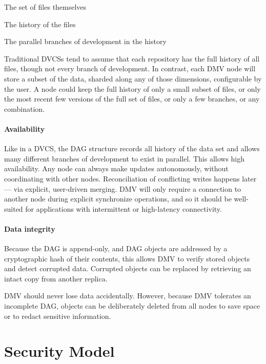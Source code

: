 \begin{tight_enumerate}
    \item The set of files themselves
    \item The history of the files
    \item The parallel branches of development in the history
\end{tight_enumerate}

Traditional \glspl{DVCS} tend to assume that each repository has the full
history of all files, though not every branch of development. In contrast, each
\gls{DMV} node will store a subset of the data, sharded along any of those
dimensions, configurable by the user. A node could keep the full history of only
a small subset of files, or only the most recent few versions of the full set of
files, or only a few branches, or any combination.


\paragraph{Availability}

Like in a \gls{DVCS}, the \gls{DAG} structure records all history of the data
set and allows many different branches of development to exist in parallel. This
allows high availability. Any node can always make updates autonomously, without
coordinating with other nodes. Reconciliation of conflicting writes happens
later --- via explicit, user-driven merging. \gls{DMV} will only require a
connection to another node during explicit synchronize operations, and so it
should be well-suited for applications with intermittent or high-latency
connectivity.


\paragraph{Data integrity}

Because the \gls{DAG} is append-only, and \gls{DAG} objects are addressed by a
cryptographic hash of their contents, this allows \gls{DMV} to verify stored
objects and detect corrupted data. Corrupted objects can be replaced by
retrieving an intact copy from another replica.

\gls{DMV} should never lose data accidentally. However, because \gls{DMV}
tolerates an incomplete \gls{DAG}, objects can be deliberately deleted from all
nodes to save space or to redact sensitive information.


\section{Security Model}
\label{security-model}

